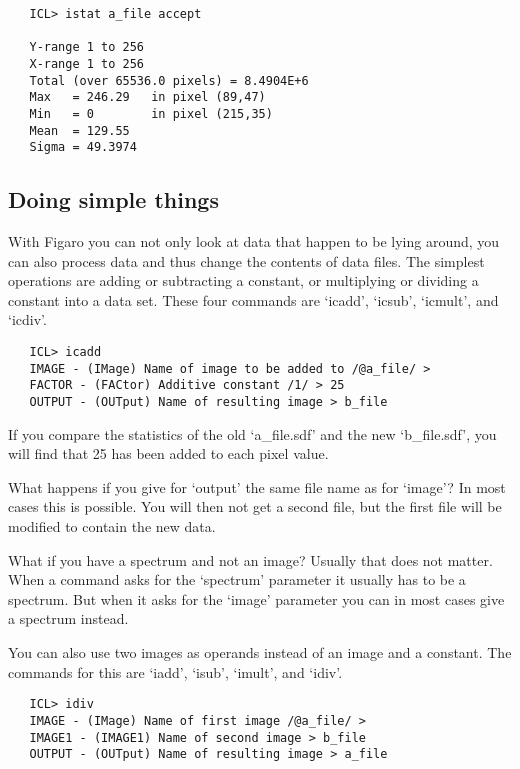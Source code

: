 \begin{verbatim}
   ICL> istat a_file accept

   Y-range 1 to 256
   X-range 1 to 256
   Total (over 65536.0 pixels) = 8.4904E+6
   Max   = 246.29   in pixel (89,47)
   Min   = 0        in pixel (215,35)
   Mean  = 129.55
   Sigma = 49.3974
\end{verbatim}


\subsection{\label{arithm}Doing simple things}

   With Figaro you can not only look at data that happen to be lying
   around, you can also process data and thus change the contents of
   data files. The simplest operations are adding or subtracting a
   constant, or multiplying or dividing a constant into a data set.
   These four commands are `icadd', `icsub', `icmult', and
   `icdiv'.

\begin{verbatim}
   ICL> icadd
   IMAGE - (IMage) Name of image to be added to /@a_file/ >
   FACTOR - (FACtor) Additive constant /1/ > 25
   OUTPUT - (OUTput) Name of resulting image > b_file
\end{verbatim}

   If you compare the statistics of the old `a\_file.sdf' and the new
   `b\_file.sdf', you will find that 25 has been added to each pixel
   value.

   What happens if you give for `output' the same file name as for
   `image'? In most cases this is possible. You will then not get a
   second file, but the first file will be modified to contain the new
   data.

   What if you have a spectrum and not an image? Usually that does not
   matter. When a command asks for the `spectrum' parameter it usually
   has to be a spectrum. But when it asks for the `image' parameter
   you can in most cases give a spectrum instead.

   You can also use two images as operands instead of an image and a
   constant. The commands for this are `iadd', `isub', `imult',
   and `idiv'.

\begin{verbatim}
   ICL> idiv
   IMAGE - (IMage) Name of first image /@a_file/ >
   IMAGE1 - (IMAGE1) Name of second image > b_file
   OUTPUT - (OUTput) Name of resulting image > a_file
\end{verbatim}

